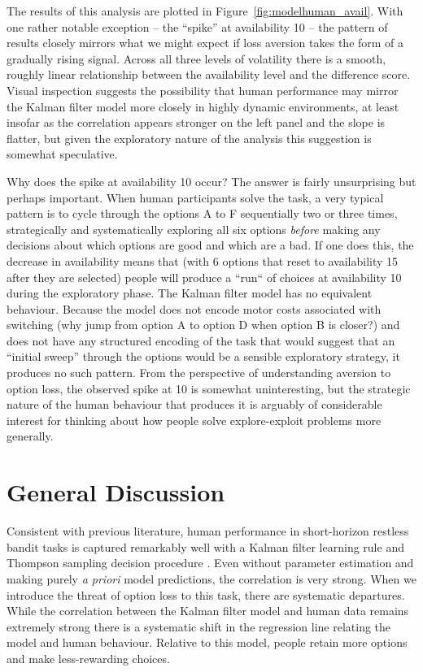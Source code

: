 \documentclass[a4paper,doc,natbib]{apa6}
\begin{document}
The results of this analysis are plotted in Figure~\ref{fig:modelhuman_avail}. With one rather notable exception -- the ``spike'' at availability 10 -- the pattern of results closely mirrors what we might expect if loss aversion takes the form of a gradually rising signal. Across all three levels of volatility there is a smooth, roughly linear relationship between the availability level and the difference score. Visual inspection suggests the possibility that human performance may mirror the Kalman filter model more closely in highly dynamic environments, at least insofar as the correlation appears stronger on the left panel and the slope is flatter, but given the exploratory nature of the analysis this suggestion is somewhat speculative.

Why does the spike at availability 10 occur? The answer is fairly unsurprising but perhaps important. When human participants solve the task, a very typical pattern is to cycle through the options A to F sequentially two or three times, strategically and systematically exploring all six options {\it before} making any decisions about which options are good and which are a bad. If one does this, the decrease in availability means that (with 6 options that reset to availability 15 after they are selected) people will produce a ``run`` of choices at availability 10 during the exploratory phase. The Kalman filter model has no equivalent behaviour. Because the model  does not encode motor costs associated with switching (why jump from option A to option D when option B is closer?) and does not have any structured encoding of the task that would suggest that an ``initial sweep'' through the options would be a sensible exploratory strategy, it produces no such pattern. From the perspective of understanding aversion to option loss, the observed spike at 10 is somewhat uninteresting, but the strategic nature of the human behaviour that produces it is arguably of considerable interest for thinking about how people solve explore-exploit problems more generally.

\section{General Discussion}

Consistent with previous literature, human performance in short-horizon restless bandit tasks is captured remarkably well with a Kalman filter learning rule and Thompson sampling decision procedure \citep{speekenbrink2015uncertainty}. Even without parameter estimation and making purely {\it a priori} model predictions, the correlation is very strong. When we introduce the threat of option loss to this task, there are systematic departures. While the  correlation between the Kalman filter model and human data remains extremely strong there is a systematic shift in the regression line relating the model and human behaviour. Relative to this model, people retain more options and make less-rewarding choices.
\end{document}
